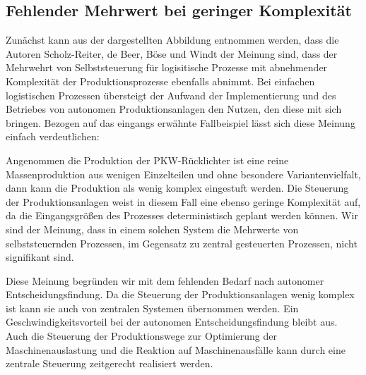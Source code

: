 \subsection{Fehlender Mehrwert bei geringer Komplexität}
\label{sec:GrenzenKomplexitaet}

Zunächst kann aus der dargestellten Abbildung entnommen werden, dass die Autoren
Scholz-Reiter, de Beer, Böse und Windt der Meinung sind, dass der Mehrwehrt von
Selbststeuerung für logisitische Prozesse mit abnehmender Komplexität der
Produktionsprozesse ebenfalls abnimmt. Bei einfachen logistischen Prozessen
übersteigt der Aufwand der Implementierung und des Betriebes von autonomen
Produktionsanlagen den Nutzen, den diese mit sich bringen. Bezogen auf das
eingangs erwähnte Fallbeispiel lässt sich diese Meinung einfach verdeutlichen:

Angenommen die Produktion der PKW-Rücklichter ist eine reine Massenproduktion
aus wenigen Einzelteilen und ohne besondere Variantenvielfalt, dann kann die
Produktion als wenig komplex eingestuft werden. Die Steuerung der
Produktionsanlagen weist in diesem Fall eine ebenso geringe Komplexität auf, da
die Eingangsgrößen des Prozesses deterministisch geplant werden können. Wir sind
der Meinung, dass in einem solchen System die Mehrwerte von selbststeuernden
Prozessen, im Gegensatz zu zentral gesteuerten Prozessen, nicht signifikant
sind.

Diese Meinung begründen wir mit dem fehlenden Bedarf nach autonomer
Entscheidungsfindung. Da die Steuerung der Produktionsanlagen wenig komplex ist
kann sie auch von zentralen Systemen übernommen werden. Ein
Geschwindigkeitsvorteil bei der autonomen Entscheidungsfindung bleibt aus. Auch
die Steuerung der Produktionswege zur Optimierung der Maschinenauslastung und
die Reaktion auf Maschinenausfälle kann durch eine zentrale Steuerung
zeitgerecht realisiert werden.
